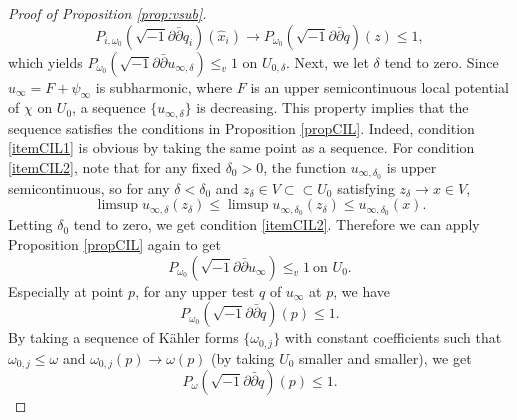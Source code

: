 \documentclass{amsart}
\numberwithin{equation}{section}
\theoremstyle{plain}
\theoremstyle{definition}
\theoremstyle{remark}
\newcommand{\delb}{\sqrt{-1}\partial\bar{\partial}}
\begin{document}
\begin{proof}[Proof of Proposition \ref{prop:vsub}]
    $$P_{i,\omega_0}(\delb q_i)(\hat{x}_i) \rightarrow P_{\omega_0}(\delb q)(z) \le 1,$$
    which yields $P_{\omega_0}(\delb u_{\infty,\delta})\le_v 1$ on $U_{0,\delta}$.
    Next, we let $\delta$ tend to zero. Since $u_\infty = F + \psi_\infty$ is subharmonic, where $F$ is an upper semicontinuous local potential of $\chi$ on $U_0$, a sequence $\{ u_{\infty,\delta} \}$ is decreasing. This property implies that the sequence satisfies the conditions in Proposition \ref{propCIL}. 
    Indeed, condition \ref{itemCIL1} is obvious by taking the same point as a sequence. For condition \ref{itemCIL2}, note that for any fixed $\delta_0>0$, the function $u_{\infty,\delta_0}$ is upper semicontinuous, so for any $\delta < \delta_0$ and $z_\delta \in V \subset\subset U_0$ satisfying $z_\delta \rightarrow x \in V$,
    $$\limsup{u_{\infty,\delta}}(z_\delta)\le \limsup{u_{\infty,\delta_0}}(z_\delta) \le u_{\infty,\delta_0}(x).$$
    Letting $\delta_0$ tend to zero, we get condition \ref{itemCIL2}. Therefore we can apply Proposition \ref{propCIL} again to get
    $$P_{\omega_0}(\delb u_\infty) \le_v 1 \ \text{on $U_0$}.$$
    Especially at point $p$, for any upper test $q$ of $u_\infty$ at $p$, we have
    $$P_{\omega_0}(\delb q)(p) \le 1.$$
    By taking a sequence of K{\"a}hler forms $\{\omega_{0,j}\}$ with constant coefficients such that $\omega_{0,j} \le \omega$ and $\omega_{0,j}(p) \rightarrow \omega(p)$ (by taking $U_0$ smaller and smaller), we get
    $$P_\omega(\delb q)(p) \le 1.$$
    

\end{proof}
\end{document}
